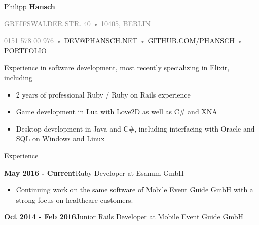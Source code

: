 \documentclass[12pt]{article}
\begin{document}
\thispagestyle{empty}



{\Huge Philipp \textbf{Hansch}}

{\footnotesize
  \textcolor{Gray}{
    \uppercase{Greifswalder Str. 40}
    •
    \uppercase{10405, Berlin}
  }

  \textcolor{Gray}{
    0151 578 00 976
    •
    \href{mailto:dev@phansch.net}{\uppercase{dev@phansch.net}}
    •
    \href{http://github.com/phansch}{\uppercase{github.com/phansch}}
    •
    \href{http://portfolio.phansch.net/\#folio-mid}{\uppercase{Portfolio}}
  }
}

\vspace{0.5cm}

Experience in software development, most recently specializing in Elixir, including

\begin{itemize}
  \setlength{\itemsep}{0cm}
  \setlength{\parskip}{0cm}
  \item 2  years of professional Ruby / Ruby on Rails experience
  \item Game development in Lua with Love2D as well as C\# and XNA
  \item Desktop development in Java and C\#, including interfacing with Oracle and SQL on Windows and Linux
\end{itemize}

{\Large Experience}

\textbf{May 2016 - Current}\hfill Ruby Developer at Esanum GmbH

\begin{itemize}
  \setlength{\itemsep}{0cm}
  \setlength{\parskip}{0cm}

  \item Continuing work on the same software of Mobile Event Guide GmbH with a strong focus on healthcare customers.
\end{itemize}

\textbf{Oct 2014 - Feb 2016}\hfill Junior Rails Developer at Mobile Event Guide GmbH
\end{document}
